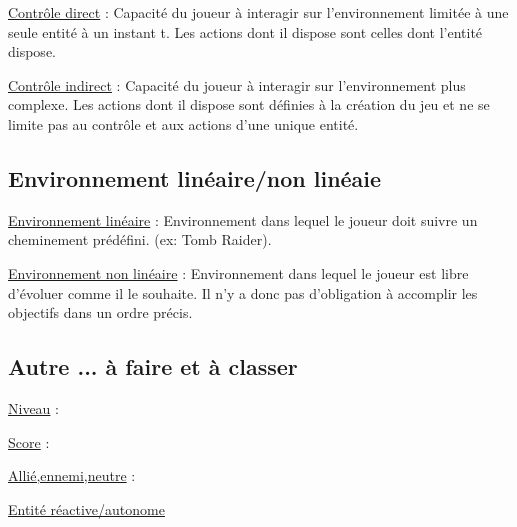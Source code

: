 \underline{Contrôle direct} :
Capacité du joueur à interagir sur l’environnement limitée à une seule entité à un instant t. 
Les actions dont il dispose sont celles dont l'entité dispose.

\underline{Contrôle indirect} :
Capacité du joueur à interagir sur l’environnement plus complexe. 
Les actions dont il dispose sont définies à la création du jeu et ne se limite pas au contrôle et aux actions d'une unique entité.

\subsection*{Environnement linéaire/non linéaie}

\underline{Environnement linéaire} : 
Environnement dans lequel le joueur doit suivre un cheminement prédéfini. (ex: Tomb Raider).

\underline{Environnement non linéaire} : 
Environnement dans lequel le joueur est libre d'évoluer comme il le souhaite. 
Il n'y a donc pas d'obligation à accomplir les objectifs dans un ordre précis.


\subsection*{Autre ... à faire et à classer}

\underline{Niveau} :

\underline{Score} :

\underline{Allié,ennemi,neutre} :

\underline{Entité réactive/autonome}


